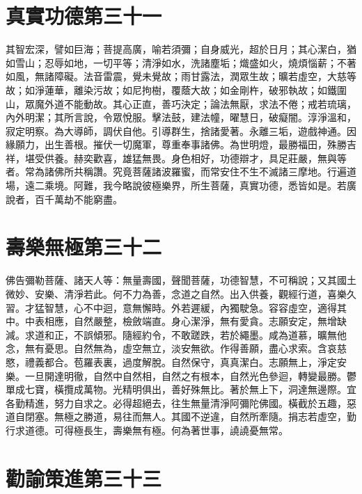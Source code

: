 \documentclass{zhvt-classic}
\begin{document}
\chapter*{真實功德第三十一}

其智宏深，譬如巨海；菩提高廣，喻若須彌；自身威光，超於日月；其心潔白，猶如雪山；忍辱如地，一切平等；清淨如水，洗諸塵垢；熾盛如火，燒煩惱薪；不著如風，無諸障礙。法音雷震，覺未覺故；雨甘露法，潤眾生故；曠若虛空，大慈等故；如淨蓮華，離染污故；如尼拘樹，覆蔭大故；如金剛杵，破邪執故；如鐵圍山，眾魔外道不能動故。其心正直，善巧決定；論法無厭，求法不倦；戒若琉璃，內外明潔；其所言說，令眾悅服。擊法鼓，建法幢，曜慧日，破癡闇。淳淨溫和，寂定明察。為大導師，調伏自他。引導群生，捨諸愛著。永離三垢，遊戲神通。因緣願力，出生善根。摧伏一切魔軍，尊重奉事諸佛。為世明燈，最勝福田，殊勝吉祥，堪受供養。赫奕歡喜，雄猛無畏。身色相好，功德辯才，具足莊嚴，無與等者。常為諸佛所共稱讚。究竟菩薩諸波羅蜜，而常安住不生不滅諸三摩地。行遍道場，遠二乘境。阿難，我今略說彼極樂界，所生菩薩，真實功德，悉皆如是。若廣說者，百千萬劫不能窮盡。

\chapter*{壽樂無極第三十二}

佛告彌勒菩薩、諸天人等：無量壽國，聲聞菩薩，功德智慧，不可稱說；又其國土微妙、安樂、清淨若此。何不力為善，念道之自然。出入供養，觀經行道，喜樂久習。才猛智慧，心不中迴，意無懈時。外若遲緩，內獨駛急。容容虛空，適得其中。中表相應，自然嚴整，檢斂端直。身心潔淨，無有愛貪。志願安定，無增缺減。求道和正，不誤傾邪。隨經約令，不敢蹉跌，若於繩墨。咸為道慕，曠無他念，無有憂思。自然無為，虛空無立，淡安無欲。作得善願，盡心求索。含哀慈愍，禮義都合。苞羅表裏，過度解脫。自然保守，真真潔白。志願無上，淨定安樂。一旦開達明徹，自然中自然相，自然之有根本，自然光色參迴，轉變最勝。鬱單成七寶，橫攬成萬物。光精明俱出，善好殊無比。著於無上下，洞達無邊際。宜各勤精進，努力自求之。必得超絕去，往生無量清淨阿彌陀佛國。橫截於五趣，惡道自閉塞。無極之勝道，易往而無人。其國不逆違，自然所牽隨。捐志若虛空，勤行求道德。可得極長生，壽樂無有極。何為著世事，譊譊憂無常。

\chapter*{勸諭策進第三十三}
\end{document}
